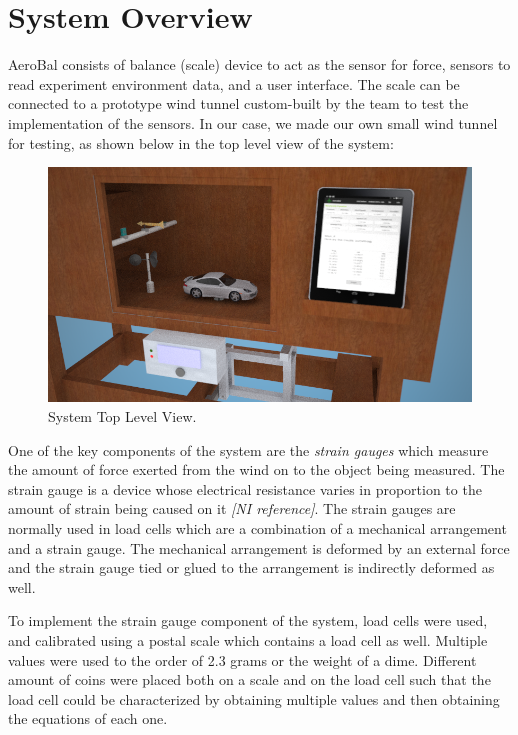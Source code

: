 \section{System Overview}

	AeroBal consists of balance (scale) device to act as the sensor for force, sensors to read experiment environment data, and a user interface. The scale can be connected to a prototype wind tunnel custom-built by the team to test the implementation of the sensors. In our case, we made our own small wind tunnel for testing, as shown below in the top level view of the system:


	\begin{figure}[H]
		\centering
			\includegraphics[scale=0.5]{img/system-toplevel}
		\caption{System Top Level View.}
	\end{figure}
	 
	One of the key components of the system are the \emph{strain gauges} which measure the amount of force exerted from the wind on to the object being measured. The strain gauge is a device whose electrical resistance varies in proportion to the amount of strain being caused on it \emph{[NI reference]}. The strain gauges are normally used in load cells which are a combination of a mechanical arrangement and a strain gauge. The mechanical arrangement is deformed by an external force and the strain gauge tied or glued to the arrangement is indirectly deformed as well. 

	To implement the strain gauge component of the system, load cells were used, and calibrated using a postal scale which contains a load cell as well. Multiple values were used to the order of 2.3 grams or the weight of a dime. Different amount of coins were placed both on a scale and on the load cell such that the load cell could be characterized by obtaining multiple values and then obtaining the equations of each one. 

